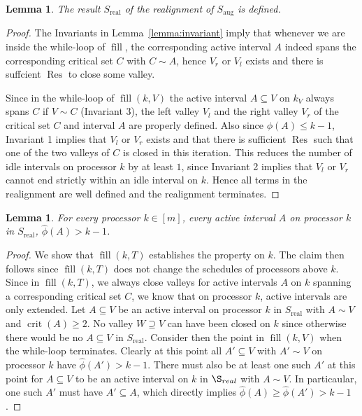 \documentclass[a4paper]{article}
\DeclareMathOperator{\aug}{aug}
\DeclareMathOperator{\real}{real}
\DeclareMathOperator{\crit}{crit}
\DeclareMathOperator{\fillop}{fill}
\DeclareMathOperator{\res}{Res}
\newtheorem{lemma}[theorem]{Lemma}
\begin{document}
\begin{lemma}\label{lemma:s_real}
  The result $S_{\real}$ of the realignment of $S_{\aug}$ is defined.
\end{lemma}
\begin{proof}
  The Invariants in Lemma~\ref{lemma:invariant} imply that whenever we are inside the while-loop of $\fillop$, the corresponding active interval $A$ indeed spans the corresponding critical set $C$ with $C \sim A$, hence $V_r$ or $V_l$ exists and there is suffcient $\res$ to close some valley.

  Since in the while-loop of $\fillop(k, V)$ the active interval $A \subseteq V$ on $k_V$ always spans $C$ if $V \sim C$ (Invariant 3), the left valley $V_l$ and the right valley $V_r$ of the critical set $C$ and interval $A$ are properly defined.
  Also since $\phi(A) \leq k - 1$, Invariant 1 implies that $V_l$ or $V_r$ exists and that there is sufficient $\res$ such that one of the two valleys of $C$ is closed in this iteration.
  This reduces the number of idle intervals on processor $k$ by at least $1$, since Invariant 2 implies that $V_l$ or $V_r$ cannot end strictly within an idle interval on $k$.
  Hence all terms in the realignment are well defined and the realignment terminates.
\end{proof}

\begin{lemma}\label{lemma:phi_prop}
  For every processor $k \in [m]$, every active interval $A$ on processor $k$ in $S_{\real}$, $\hat \phi(A) > k - 1$.
\end{lemma}
\begin{proof}
  We show that $\fillop(k, T)$ establishes the property on $k$.
  The claim then follows since $\fillop(k, T)$ does not change the schedules of processors above $k$.
  Since in $\fillop(k, T)$, we always close valleys for active intervals $A$ on $k$ spanning a corresponding critical set $C$, we know that on processor $k$, active intervals are only extended.
  Let $A \subseteq V$ be an active interval on processor $k$ in $S_{\real}$ with $A \sim V$ and $\crit(A) \geq 2$.
  No valley $W \supseteq V$ can have been closed on $k$ since otherwise there would be no $A \subseteq V$ in $S_{\real}$.
  Consider then the point in $\fillop(k, V)$ when the while-loop terminates.
  Clearly at this point all $A' \subseteq V$ with $A' \sim V$ on processor $k$ have $\hat \phi(A') > k - 1$.
  There must also be at least one such $A'$ at this point for $A \subseteq V$ to be an active interval on $k$ in $\S_{real}$ with $A \sim V$.
  In particaular, one such $A'$ must have $A' \subseteq A$, which directly implies $\hat \phi(A) \geq \hat \phi(A') > k - 1$.
\end{proof}
\end{document}

